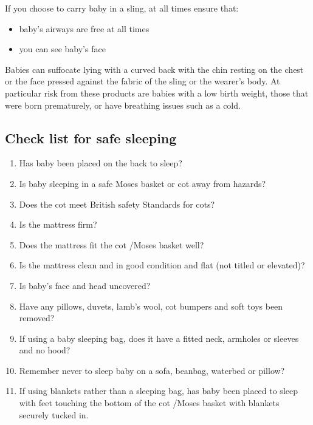 If you choose to carry baby in a sling, at all times ensure that:

\begin{itemize}
\item baby’s airways are free at all times
\item you can see baby’s face
\end{itemize}

Babies can suffocate lying with a curved back with the chin resting on the chest or the face
pressed against the fabric of the sling or the wearer’s body. At particular risk from these
products are babies with a low birth weight, those that were born prematurely, or have
breathing issues such as a cold.

\subsection{Check list for safe sleeping}
\begin{enumerate}
\item Has baby been placed on the back to sleep?
\item Is baby sleeping in a safe Moses basket or cot away from hazards?
\item Does the cot meet British safety Standards for cots?
\item Is the mattress firm? 
\item Does the mattress fit the cot /Moses basket well?
\item Is the mattress clean and in good condition and flat (not titled or elevated)?
\item Is baby’s face and head uncovered?
\item Have any pillows, duvets, lamb’s wool, cot bumpers and soft toys been removed?
\item If using a baby sleeping bag, does it have a fitted neck, armholes or sleeves and no hood?
\item Remember never to sleep baby on a sofa, beanbag, waterbed or pillow?
\item If using blankets rather than a sleeping bag, has baby been placed
to sleep with feet touching the bottom of the cot /Moses basket with blankets securely tucked in.
\end{enumerate}



